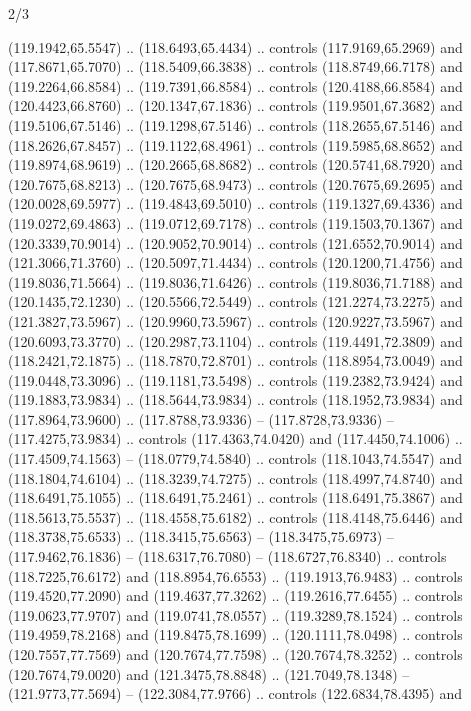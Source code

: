 \begin{flagdescription}{2/3}
\begin{scope}[xshift=0.5\flaglength,yshift=0.5\flagwidth,scale=\flagwidth/180]
\begin{scope}[y=0.8pt, x=0.8pt, yscale=-1,shift={(-168.75,-108.75)}]
  (119.1942,65.5547) .. (118.6493,65.4434) .. controls (117.9169,65.2969) and
  (117.8671,65.7070) .. (118.5409,66.3838) .. controls (118.8749,66.7178) and
  (119.2264,66.8584) .. (119.7391,66.8584) .. controls (120.4188,66.8584) and
  (120.4423,66.8760) .. (120.1347,67.1836) .. controls (119.9501,67.3682) and
  (119.5106,67.5146) .. (119.1298,67.5146) .. controls (118.2655,67.5146) and
  (118.2626,67.8457) .. (119.1122,68.4961) .. controls (119.5985,68.8652) and
  (119.8974,68.9619) .. (120.2665,68.8682) .. controls (120.5741,68.7920) and
  (120.7675,68.8213) .. (120.7675,68.9473) .. controls (120.7675,69.2695) and
  (120.0028,69.5977) .. (119.4843,69.5010) .. controls (119.1327,69.4336) and
  (119.0272,69.4863) .. (119.0712,69.7178) .. controls (119.1503,70.1367) and
  (120.3339,70.9014) .. (120.9052,70.9014) .. controls (121.6552,70.9014) and
  (121.3066,71.3760) .. (120.5097,71.4434) .. controls (120.1200,71.4756) and
  (119.8036,71.5664) .. (119.8036,71.6426) .. controls (119.8036,71.7188) and
  (120.1435,72.1230) .. (120.5566,72.5449) .. controls (121.2274,73.2275) and
  (121.3827,73.5967) .. (120.9960,73.5967) .. controls (120.9227,73.5967) and
  (120.6093,73.3770) .. (120.2987,73.1104) .. controls (119.4491,72.3809) and
  (118.2421,72.1875) .. (118.7870,72.8701) .. controls (118.8954,73.0049) and
  (119.0448,73.3096) .. (119.1181,73.5498) .. controls (119.2382,73.9424) and
  (119.1883,73.9834) .. (118.5644,73.9834) .. controls (118.1952,73.9834) and
  (117.8964,73.9600) .. (117.8788,73.9336) -- (117.8728,73.9336) --
  (117.4275,73.9834) .. controls (117.4363,74.0420) and (117.4450,74.1006) ..
  (117.4509,74.1563) -- (118.0779,74.5840) .. controls (118.1043,74.5547) and
  (118.1804,74.6104) .. (118.3239,74.7275) .. controls (118.4997,74.8740) and
  (118.6491,75.1055) .. (118.6491,75.2461) .. controls (118.6491,75.3867) and
  (118.5613,75.5537) .. (118.4558,75.6182) .. controls (118.4148,75.6446) and
  (118.3738,75.6533) .. (118.3415,75.6563) -- (118.3475,75.6973) --
  (117.9462,76.1836) -- (118.6317,76.7080) -- (118.6727,76.8340) .. controls
  (118.7225,76.6172) and (118.8954,76.6553) .. (119.1913,76.9483) .. controls
  (119.4520,77.2090) and (119.4637,77.3262) .. (119.2616,77.6455) .. controls
  (119.0623,77.9707) and (119.0741,78.0557) .. (119.3289,78.1524) .. controls
  (119.4959,78.2168) and (119.8475,78.1699) .. (120.1111,78.0498) .. controls
  (120.7557,77.7569) and (120.7674,77.7598) .. (120.7674,78.3252) .. controls
  (120.7674,79.0020) and (121.3475,78.8848) .. (121.7049,78.1348) --
  (121.9773,77.5694) -- (122.3084,77.9766) .. controls (122.6834,78.4395) and

\end{scope}
\end{scope}
\end{flagdescription}
